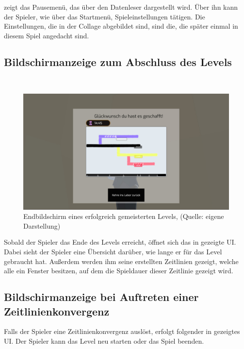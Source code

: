  zeigt das Pausemenü, das über den Datenleser dargestellt wird. Über ihn kann der Spieler, wie über das Startmenü, Spieleinstellungen tätigen. Die Einstellungen, die in der Collage abgebildet sind, sind die, die später einmal in diesem Spiel angedacht sind.

\subsection{Bildschirmanzeige zum Abschluss des Levels}
~
\begin{figure}[ht]
\centering
\includegraphics[width=1\linewidth]{content/pictures/Level Endscreen.jpg}
\caption{Endbildschirm eines erfolgreich gemeisterten Levels, (Quelle: eigene Darstellung)}
\label{fig:endscreen}
\end{figure}

Sobald der Spieler das Ende des Levels erreicht, öffnet sich das in  gezeigte \ac{UI}. Dabei sieht der Spieler eine Übersicht darüber, wie lange er für das Level gebraucht hat. Außerdem werden ihm seine erstellten Zeitlinien gezeigt, welche alle ein Fenster besitzen, auf dem die Spieldauer dieser Zeitlinie gezeigt wird.

\subsection{Bildschirmanzeige bei Auftreten einer Zeitlinienkonvergenz}

Falls der Spieler eine Zeitlinienkonvergenz auslöst, erfolgt folgender in  gezeigtes \ac{UI}. Der Spieler kann das Level neu starten oder das Spiel beenden.

